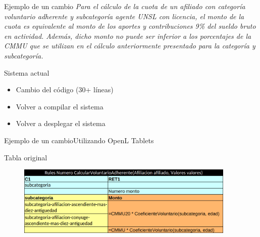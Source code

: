 \documentclass[10pt]{beamer}
\begin{document}
\begin{frame}{Ejemplo de un cambio}
    \emph{
    Para el cálculo de la cuota de un afiliado con categoría voluntario adherente y subcategoría agente UNSL con licencia, el monto de la cuota es equivalente al monto de los aportes y contribuciones 9\% del sueldo bruto en actividad. Además, dicho monto no puede ser inferior a los porcentajes de la CMMU que se utilizan en el cálculo anteriormente presentado para la categoría y subcategoría.
    }
    \begin{block}{Sistema actual}
        \begin{itemize}
            \item Cambio del código (30+ líneas)
            \item Volver a compilar el sistema
            \item Volver a desplegar el sistema
        \end{itemize}
    \end{block}
\end{frame}

\begin{frame}{Ejemplo de un cambio}{Utilizando OpenL Tablets}
    \begin{block}{Tabla original}
        \begin{figure}
            \centering
            \includegraphics[width=0.93\textwidth]{tables/voluntario.png}
        \end{figure}
    \end{block}
\end{frame}

\end{document}
